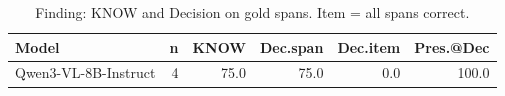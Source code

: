 \begin{table}[t]\centering\small
\caption{Finding: KNOW and Decision on gold spans. Item = all spans correct.}
\label{tab:news-decision}
\begin{tabular}{l r r r r r}\toprule
Model & n & KNOW & Dec.span & Dec.item & Pres.@Dec \\
\midrule
Qwen3-VL-8B-Instruct & 4 & 75.0 & 75.0 & 0.0 & 100.0 \\
\bottomrule\end{tabular}\end{table}
